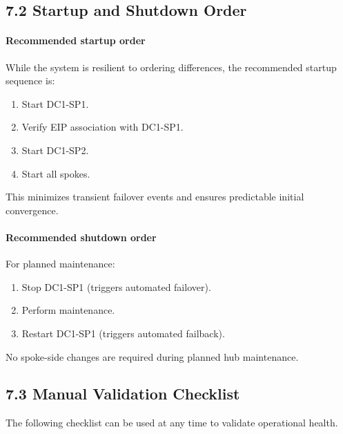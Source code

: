\documentclass[11pt]{article}
\begin{document}
\subsection{7.2 Startup and Shutdown Order}
\label{sec:startup-shutdown-order}

\paragraph{Recommended startup order}
While the system is resilient to ordering differences, the recommended startup sequence is:
\begin{enumerate}
  \item Start DC1-SP1.
  \item Verify EIP association with DC1-SP1.
  \item Start DC1-SP2.
  \item Start all spokes.
\end{enumerate}

This minimizes transient failover events and ensures predictable initial convergence.

\paragraph{Recommended shutdown order}
For planned maintenance:
\begin{enumerate}
  \item Stop DC1-SP1 (triggers automated failover).
  \item Perform maintenance.
  \item Restart DC1-SP1 (triggers automated failback).
\end{enumerate}

No spoke-side changes are required during planned hub maintenance.

%
%
\subsection{7.3 Manual Validation Checklist}
\label{sec:manual-validation-checklist}

The following checklist can be used at any time to validate operational health.
\end{document}

